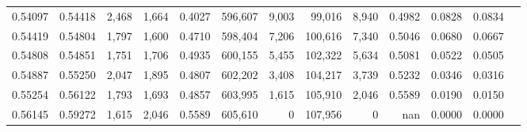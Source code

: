 \begin{tabular}{rrrrrrrrrrrrr}
0.54097 & 0.54418 &  2,468 & 1,664 &                                     0.4027 & 596,607 &   9,003 &  99,016 &   8,940 & 0.4982 & 0.0828 & 0.0834 \\
0.54419 & 0.54804 &  1,797 & 1,600 &                                     0.4710 & 598,404 &   7,206 & 100,616 &   7,340 & 0.5046 & 0.0680 & 0.0667 \\
0.54808 & 0.54851 &  1,751 & 1,706 &                                     0.4935 & 600,155 &   5,455 & 102,322 &   5,634 & 0.5081 & 0.0522 & 0.0505 \\
0.54887 & 0.55250 &  2,047 & 1,895 &                                     0.4807 & 602,202 &   3,408 & 104,217 &   3,739 & 0.5232 & 0.0346 & 0.0316 \\
0.55254 & 0.56122 &  1,793 & 1,693 &                                     0.4857 & 603,995 &   1,615 & 105,910 &   2,046 & 0.5589 & 0.0190 & 0.0150 \\
0.56145 & 0.59272 &  1,615 & 2,046 &                                     0.5589 & 605,610 &       0 & 107,956 &       0 &    nan & 0.0000 & 0.0000 \\
\bottomrule
\end{tabular}
